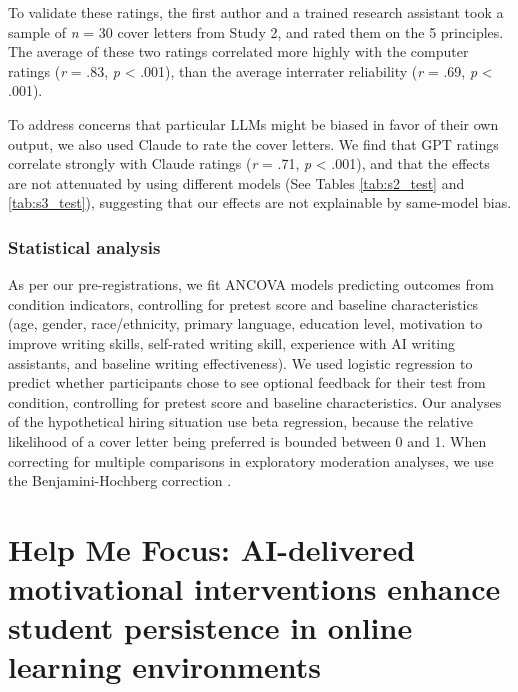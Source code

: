 \documentclass[11pt]{report}
\begin{document}
\begin{mainf}
To validate these ratings, the first author and a trained research assistant took a sample of \textit{n} = 30 cover letters from Study 2, and rated them on the 5 principles. The average of these two ratings correlated more highly with the computer ratings (\textit{r} = .83, \textit{p} < .001), than the average interrater reliability (\textit{r} = .69, \textit{p} < .001).

To address concerns that particular LLMs might be biased in favor of their own output, we also used Claude to rate the cover letters. We find that GPT ratings correlate strongly with Claude ratings (\textit{r} = .71, \textit{p} < .001), and that the effects are not attenuated by using different models (See Tables \ref{tab:s2_test} and \ref{tab:s3_test}), suggesting that our effects are not explainable by same-model bias.

\subsection{Statistical analysis}
As per our pre-registrations, we fit ANCOVA models predicting outcomes from condition indicators, controlling for pretest score and baseline characteristics (age, gender, race/ethnicity, primary language, education level, motivation to improve writing skills, self-rated writing skill, experience with AI writing assistants, and baseline writing effectiveness). We used logistic regression to predict whether participants chose to see optional feedback for their test from condition, controlling for pretest score and baseline characteristics. 
Our analyses of the hypothetical hiring situation use beta regression, because the relative likelihood of a cover letter being preferred is bounded between 0 and 1.
When correcting for multiple comparisons in exploratory moderation analyses, we use the Benjamini-Hochberg correction \cite{benjamini1995controlling}. 

\chapter{Help Me Focus: AI-delivered motivational interventions enhance student persistence in online learning environments}


\end{mainf}
\end{document}
